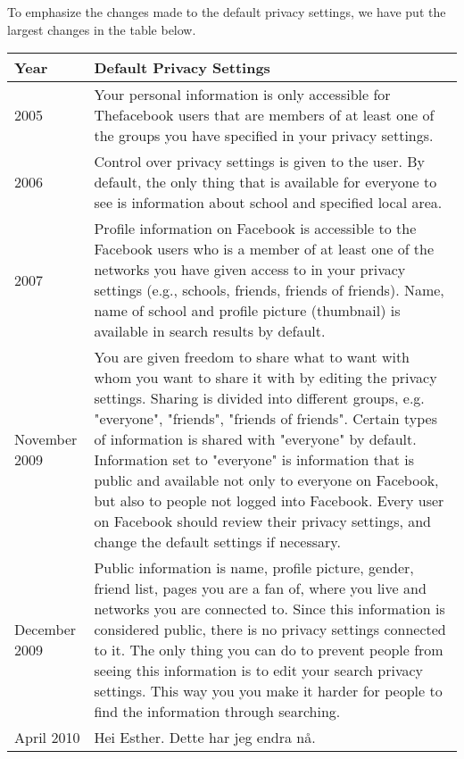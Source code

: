 To emphasize the changes made to the default privacy settings, we have put the largest changes in the table below. 
\begin{center}
    \begin{tabular}{ | l | p{9cm} |}
    \hline
    \textbf{Year} & \textbf{Default Privacy Settings} \\ 
    \hline
    2005 & Your personal information is only accessible for 			Thefacebook users that are members of at least one of the 			groups you have specified in your privacy settings.\\ 
    \hline
    2006 & Control over privacy settings is given to the user. By 		default, the only thing that is available for everyone to see 		is information about school and specified local area. \\ 
    \hline
    2007 & Profile information on Facebook is accessible to the 		Facebook users who is a member of at least one of the networks 		you have given access to in your privacy settings (e.g., 			schools, friends, friends of friends). Name, name of school and 	profile picture (thumbnail) is available in search results by 		default.\\
    \hline
    November 2009 & You are given freedom to share what to want 		with whom you want to share it with by editing the privacy 			settings. Sharing is divided into different groups, e.g. 			"everyone", "friends", "friends of friends". Certain types of		information is shared with "everyone" by default. Information 		set to "everyone" is information that is public and available 		not only to everyone on Facebook, but also to people not logged 	into Facebook. Every user on Facebook should review their 			privacy settings, and change the default settings if necessary.
	\\
	\hline
    December 2009 & Public information is name, profile picture, 		gender, friend list, pages you are a fan of, where you live and 	networks you are connected to. Since this information is 			considered public, there is no privacy settings connected to 		it. The only thing you can do to prevent people from seeing 		this information is to edit your search privacy settings. This 		way you you make it harder for people to find the 					information through searching. \\
    \hline
    April 2010 & Hei Esther. Dette har jeg endra nå. \\
    \hline
    \end{tabular}
\end{center}



\markboth{}{}